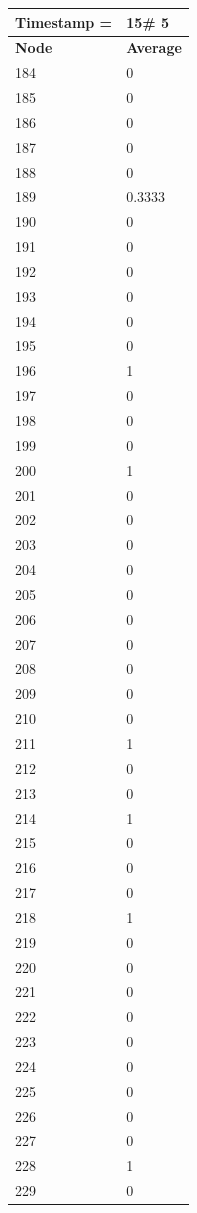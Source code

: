 \begin{tabular}{|l||l|}
\hline
\textbf{Timestamp =} & \textbf{15}\# 5\\\hline
	\textbf{Node} & \textbf{Average} \\ \hline
\hline
	184 & 0 \\ \hline
	185 & 0 \\ \hline
	186 & 0 \\ \hline
	187 & 0 \\ \hline
	188 & 0 \\ \hline
	189 & 0.3333 \\ \hline
	190 & 0 \\ \hline
	191 & 0 \\ \hline
	192 & 0 \\ \hline
	193 & 0 \\ \hline
	194 & 0 \\ \hline
	195 & 0 \\ \hline
	196 & 1 \\ \hline
	197 & 0 \\ \hline
	198 & 0 \\ \hline
	199 & 0 \\ \hline
	200 & 1 \\ \hline
	201 & 0 \\ \hline
	202 & 0 \\ \hline
	203 & 0 \\ \hline
	204 & 0 \\ \hline
	205 & 0 \\ \hline
	206 & 0 \\ \hline
	207 & 0 \\ \hline
	208 & 0 \\ \hline
	209 & 0 \\ \hline
	210 & 0 \\ \hline
	211 & 1 \\ \hline
	212 & 0 \\ \hline
	213 & 0 \\ \hline
	214 & 1 \\ \hline
	215 & 0 \\ \hline
	216 & 0 \\ \hline
	217 & 0 \\ \hline
	218 & 1 \\ \hline
	219 & 0 \\ \hline
	220 & 0 \\ \hline
	221 & 0 \\ \hline
	222 & 0 \\ \hline
	223 & 0 \\ \hline
	224 & 0 \\ \hline
	225 & 0 \\ \hline
	226 & 0 \\ \hline
	227 & 0 \\ \hline
	228 & 1 \\ \hline
	229 & 0 \\ \hline
\end{tabular}
